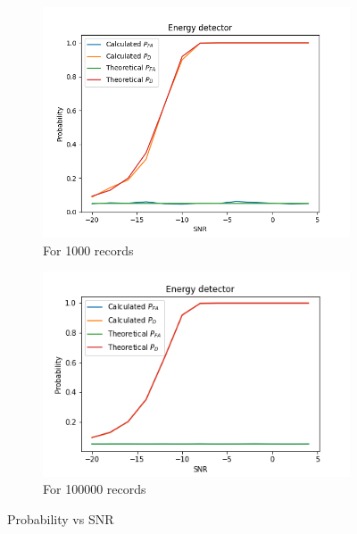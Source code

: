 \documentclass[a4 paper]{article}
\begin{document}
\newpage
{}
\vspace{-2em}
\vspace{-2em}
\begin{figure}[h]
	\centering
	\begin{subfigure}{.5\textwidth}
		\includegraphics[width=1\linewidth]{../results/energy_detector_a.png}
		\caption{For 1000 records}
		\label{fig:energy_a1}
	\end{subfigure}%
	\begin{subfigure}{.5\textwidth}
		\includegraphics[width=1.15\linewidth]{../results/energy_detector_a_ideal.png}
		\caption{For 100000 records}
		\label{fig:energy_a2}
	\end{subfigure}
	\caption{Probability vs SNR}
	\label{fig:energy_a}
\end{figure}
\end{document}
